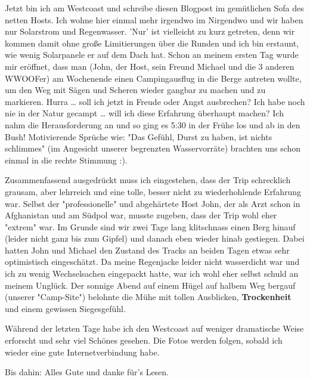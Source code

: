 Jetzt bin ich am Westcoast und schreibe diesen Blogpost im gemütlichen
Sofa des netten Hosts. Ich wohne hier einmal mehr irgendwo im Nirgendwo
und wir haben nur Solarstrom und Regenwasser. 'Nur' ist vielleicht zu
kurz getreten, denn wir kommen damit ohne große Limitierungen über die
Runden und ich bin erstaunt, wie wenig Solarpanele er auf dem Dach hat.
Schon an meinem ersten Tag wurde mir eröffnet, dass man (John, der Host,
sein Freund Michael und die 3 anderen WWOOFer) am Wochenende einen
Campingausflug in die Berge antreten wollte, um den Weg mit Sägen und
Scheren wieder gangbar zu machen und zu markieren. Hurra \ldots{} soll
ich jetzt in Freude oder Angst ausbrechen? Ich habe noch nie in der
Natur gecampt \ldots{} will ich diese Erfahrung überhaupt machen? Ich
nahm die Herausforderung an und so ging es 5:30 in der Frühe los und ab
in den Bush! Motivierende Sprüche wie: "Das Gefühl, Durst zu haben, ist
nichts schlimmes" (im Angesicht unserer begrenzten Wasservorräte)
brachten uns schon einmal in die rechte Stimmung :).

Zusammenfassend ausgedrückt muss ich eingestehen, dass der Trip
schrecklich grausam, aber lehrreich und eine tolle, besser nicht zu
wiederhohlende Erfahrung war. Selbst der "professionelle" und
abgehärtete Host John, der als Arzt schon in Afghanistan und am Südpol
war, musste zugeben, dass der Trip wohl eher "extrem" war. Im Grunde
sind wir zwei Tage lang klitschnass einen Berg hinauf (leider nicht ganz
bis zum Gipfel) und danach eben wieder hinab gestiegen. Dabei hatten
John und Michael den Zustand des Tracks an beiden Tagen etwas sehr
optimistisch eingeschätzt. Da meine Regenjacke leider nicht wasserdicht
war und ich zu wenig Wechselsachen eingepackt hatte, war ich wohl eher
selbst schuld an meinem Unglück. Der sonnige Abend auf einem Hügel auf
halbem Weg bergauf (unserer "Camp-Site") belohnte die Mühe mit tollen
Ausblicken, \textbf{\textbf{Trockenheit}} und einem gewissen
Siegesgefühl.

Während der letzten Tage habe ich den Westcoast auf weniger dramatische
Weise erforscht und sehr viel Schönes gesehen. Die Fotos werden folgen,
sobald ich wieder eine gute Internetverbindung habe.

Bis dahin: Alles Gute und danke für's Lesen.
